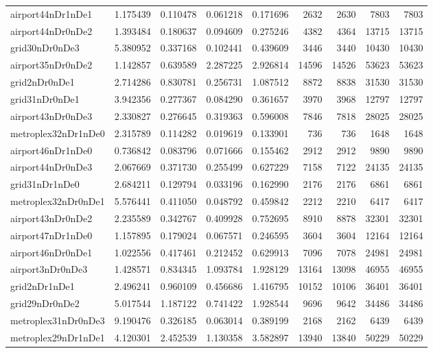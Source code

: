 \begin{longtable}{|l|r|r|r|r|r|r|r|r|}
airport44nDr1nDe1 & 1.175439 & 0.110478 & 0.061218 & 0.171696 & 2632 & 2630 & 7803 & 7803 \\
airport44nDr0nDe2 & 1.393484 & 0.180637 & 0.094609 & 0.275246 & 4382 & 4364 & 13715 & 13715 \\
grid30nDr0nDe3 & 5.380952 & 0.337168 & 0.102441 & 0.439609 & 3446 & 3440 & 10430 & 10430 \\
airport35nDr0nDe2 & 1.142857 & 0.639589 & 2.287225 & 2.926814 & 14596 & 14526 & 53623 & 53623 \\
grid2nDr0nDe1 & 2.714286 & 0.830781 & 0.256731 & 1.087512 & 8872 & 8838 & 31530 & 31530 \\
grid31nDr0nDe1 & 3.942356 & 0.277367 & 0.084290 & 0.361657 & 3970 & 3968 & 12797 & 12797 \\
airport43nDr0nDe3 & 2.330827 & 0.276645 & 0.319363 & 0.596008 & 7846 & 7818 & 28025 & 28025 \\
metroplex32nDr1nDe0 & 2.315789 & 0.114282 & 0.019619 & 0.133901 & 736 & 736 & 1648 & 1648 \\
airport46nDr1nDe0 & 0.736842 & 0.083796 & 0.071666 & 0.155462 & 2912 & 2912 & 9890 & 9890 \\
airport44nDr0nDe3 & 2.067669 & 0.371730 & 0.255499 & 0.627229 & 7158 & 7122 & 24135 & 24135 \\
grid31nDr1nDe0 & 2.684211 & 0.129794 & 0.033196 & 0.162990 & 2176 & 2176 & 6861 & 6861 \\
metroplex32nDr0nDe1 & 5.576441 & 0.411050 & 0.048792 & 0.459842 & 2212 & 2210 & 6417 & 6417 \\
airport43nDr0nDe2 & 2.235589 & 0.342767 & 0.409928 & 0.752695 & 8910 & 8878 & 32301 & 32301 \\
airport47nDr1nDe0 & 1.157895 & 0.179024 & 0.067571 & 0.246595 & 3604 & 3604 & 12164 & 12164 \\
airport46nDr0nDe1 & 1.022556 & 0.417461 & 0.212452 & 0.629913 & 7096 & 7078 & 24981 & 24981 \\
airport3nDr0nDe3 & 1.428571 & 0.834345 & 1.093784 & 1.928129 & 13164 & 13098 & 46955 & 46955 \\
grid2nDr1nDe1 & 2.496241 & 0.960109 & 0.456686 & 1.416795 & 10152 & 10106 & 36401 & 36401 \\
grid29nDr0nDe2 & 5.017544 & 1.187122 & 0.741422 & 1.928544 & 9696 & 9642 & 34486 & 34486 \\
metroplex31nDr0nDe3 & 9.190476 & 0.326185 & 0.063014 & 0.389199 & 2168 & 2162 & 6439 & 6439 \\
metroplex29nDr1nDe1 & 4.120301 & 2.452539 & 1.130358 & 3.582897 & 13940 & 13840 & 50229 & 50229 \\

\end{longtable}
